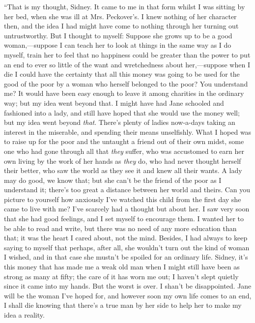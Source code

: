 ``That is my thought, Sidney. It came to me in that form whilst I was
sitting by her bed, when she was ill at Mrs. Peckover's. I knew nothing
of her character then, and the idea I had might have come to nothing
through her turning out untrustworthy. But I thought to myself: Suppose
she grows up to be a good woman,---suppose I can teach her to look at
things in the same way as I do myself, train her to feel that no
happiness could be greater than the power to put an end to ever so
little of the want and wretchedness about her,---suppose when I die I
could have the certainty that all this money was going to be used for
the good of the poor by a woman who herself belonged to the poor? You
understand me? It would have been easy enough to leave it among
charities in the ordinary way; but my idea went beyond that. I might
have had Jane schooled and fashioned into a lady, and still have hoped
that she {\protect\hypertarget{142}{}{}}would use the money well; but my
idea went beyond \emph{that}. There's plenty of ladies now-a-days taking
an interest in the miserable, and spending their means unselfishly. What
I hoped was to raise up for the poor and the untaught a friend out of
their own midst, some one who had gone through all that \emph{they}
suffer, who was accustomed to earn her own living by the work of her
hands as \emph{they} do, who had never thought herself their better, who
saw the world as they see it and knew all their wants. A lady may do
good, we know that; but she can't be the friend of the poor as I
understand it; there's too great a distance between her world and
theirs. Can you picture to yourself how anxiously I've watched this
child from the first day she came to live with me? I've scarcely had a
thought but about her. I saw very soon that she had good feelings, and I
set myself to encourage them. I wanted her to be able to read and write,
but there was no need of any more education than that; it was the heart
I cared about, not the mind. Besides, I had
{\protect\hypertarget{143}{}{}}always to keep saying to myself that
perhaps, after all, she wouldn't turn out the kind of woman I wished,
and in that case she mustn't be spoiled for an ordinary life. Sidney,
it's this money that has made me a weak old man when I might still have
been as strong as many at fifty; the care of it has worn me out; I
haven't slept quietly since it came into my hands. But the worst is
over. I shan't be disappointed. Jane will be the woman I've hoped for,
and however soon my own life comes to an end, I shall die knowing that
there's a true man by her side to help her to make my idea a reality.

